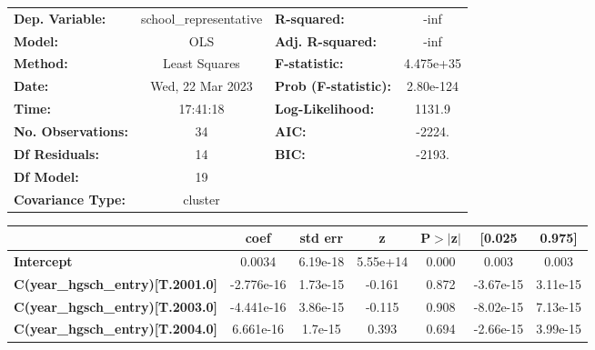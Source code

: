 \begin{center}
\begin{tabular}{lclc}
\toprule
\textbf{Dep. Variable:}                  & school\_representative & \textbf{  R-squared:         } &      -inf   \\
\textbf{Model:}                          &          OLS           & \textbf{  Adj. R-squared:    } &      -inf   \\
\textbf{Method:}                         &     Least Squares      & \textbf{  F-statistic:       } & 4.475e+35   \\
\textbf{Date:}                           &    Wed, 22 Mar 2023    & \textbf{  Prob (F-statistic):} & 2.80e-124   \\
\textbf{Time:}                           &        17:41:18        & \textbf{  Log-Likelihood:    } &    1131.9   \\
\textbf{No. Observations:}               &             34         & \textbf{  AIC:               } &    -2224.   \\
\textbf{Df Residuals:}                   &             14         & \textbf{  BIC:               } &    -2193.   \\
\textbf{Df Model:}                       &             19         & \textbf{                     } &             \\
\textbf{Covariance Type:}                &        cluster         & \textbf{                     } &             \\
\bottomrule
\end{tabular}
\begin{tabular}{lcccccc}
                                         & \textbf{coef} & \textbf{std err} & \textbf{z} & \textbf{P$> |$z$|$} & \textbf{[0.025} & \textbf{0.975]}  \\
\midrule
\textbf{Intercept}                       &       0.0034  &     6.19e-18     &  5.55e+14  &         0.000        &        0.003    &        0.003     \\
\textbf{C(year\_hgsch\_entry)[T.2001.0]} &   -2.776e-16  &     1.73e-15     &    -0.161  &         0.872        &    -3.67e-15    &     3.11e-15     \\
\textbf{C(year\_hgsch\_entry)[T.2003.0]} &   -4.441e-16  &     3.86e-15     &    -0.115  &         0.908        &    -8.02e-15    &     7.13e-15     \\
\textbf{C(year\_hgsch\_entry)[T.2004.0]} &    6.661e-16  &      1.7e-15     &     0.393  &         0.694        &    -2.66e-15    &     3.99e-15     \\

\end{tabular}
\end{center}
